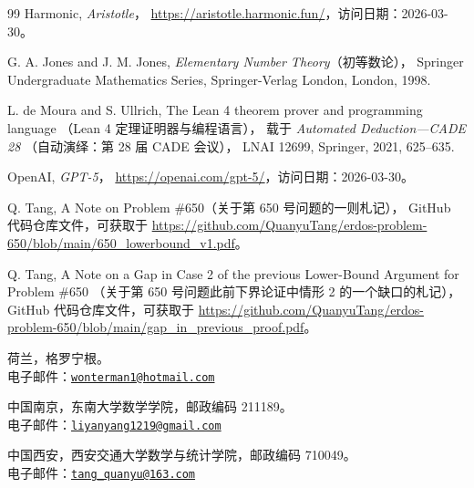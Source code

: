 \documentclass[UTF8,a4paper,oneside,openany,fontset=fandol,zihao=-4]{ctexbook}
\theoremstyle{chinesestyle}
\begin{document}
\begin{thebibliography}{99}
Harmonic,
\emph{Aristotle}，
\url{https://aristotle.harmonic.fun/}，访问日期：2026-03-30。

G. A. Jones and J. M. Jones,
\emph{Elementary Number Theory}（初等数论），
Springer Undergraduate Mathematics Series,
Springer-Verlag London, London, 1998.

L. de Moura and S. Ullrich,
The Lean 4 theorem prover and programming language
（Lean 4 定理证明器与编程语言），
载于 \emph{Automated Deduction---CADE 28}
（自动演绎：第 28 届 CADE 会议），
LNAI 12699, Springer, 2021, 625--635.

OpenAI,
\emph{GPT-5}，
\url{https://openai.com/gpt-5/}，访问日期：2026-03-30。

Q. Tang,
A Note on Problem \#650（关于第 650 号问题的一则札记），
GitHub 代码仓库文件，可获取于
\url{https://github.com/QuanyuTang/erdos-problem-650/blob/main/650_lowerbound_v1.pdf}。

Q. Tang,
A Note on a Gap in Case 2 of the previous Lower-Bound Argument for Problem \#650
（关于第 650 号问题此前下界论证中情形 2 的一个缺口的札记），
GitHub 代码仓库文件，可获取于
\url{https://github.com/QuanyuTang/erdos-problem-650/blob/main/gap_in_previous_proof.pdf}。

\end{thebibliography}

\bigskip
\noindent 荷兰，格罗宁根。\\
电子邮件：\href{mailto:wonterman1@hotmail.com}{\nolinkurl{wonterman1@hotmail.com}}

\medskip
\noindent 中国南京，东南大学数学学院，邮政编码 211189。\\
电子邮件：\href{mailto:liyanyang1219@gmail.com}{\nolinkurl{liyanyang1219@gmail.com}}

\medskip
\noindent 中国西安，西安交通大学数学与统计学院，邮政编码 710049。\\
电子邮件：\href{mailto:tang_quanyu@163.com}{\nolinkurl{tang_quanyu@163.com}}
\end{document}
